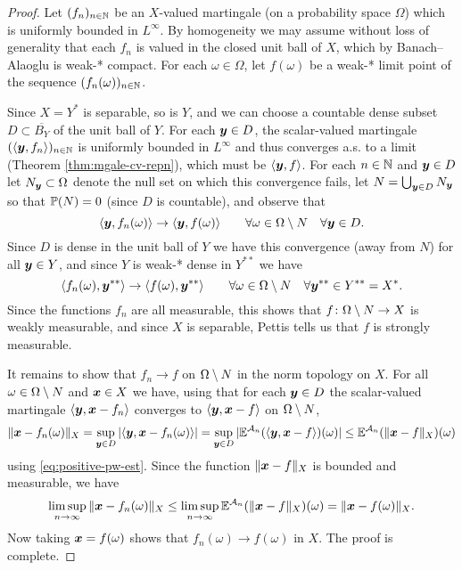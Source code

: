 \begin{proof}
  Let $(f_n)_{n \in \N}$ be an $X$-valued martingale (on a probability space $\Omega$) which is uniformly bounded in $L^\infty$.
  By homogeneity we may assume without loss of generality that each $f_n$ is valued in the closed unit ball of $X$, which by Banach--Alaoglu is weak-* compact.
  For each $\omega \in \Omega$, let $f(\omega)$ be a weak-* limit point of the sequence $(f_n(\omega))_{n \in \N}$.
  
  Since $X = Y^*$ is separable, so is $Y$, and we can choose a countable dense subset $D \subset \overline{B_{Y}}$ of the unit ball of $Y$.
  For each $\mb{y} \in D$, the scalar-valued martingale $(\langle \mb{y}, f_n \rangle)_{n \in \N}$ is uniformly bounded in $L^\infty$ and thus converges a.s. to a limit (Theorem \ref{thm:mgale-cv-repn}), which must be $\langle \mb{y}, f \rangle$.
  For each $n \in \N$ and $\mb{y} \in D$ let $N_{\mb{y}} \subset \Omega$ denote the null set on which this convergence fails, let $N = \bigcup_{\mb{y} \in D} N_{\mb{y}}$ so that $\P(N) = 0$ (since $D$ is countable), and observe that
  \begin{equation*}
    \langle \mb{y}, f_n(\omega) \rangle \to \langle \mb{y}, f(\omega) \rangle \qquad \forall \omega \in \Omega \sm N \quad \forall \mb{y} \in D.
  \end{equation*}
  Since $D$ is dense in the unit ball of $Y$ we have this convergence (away from $N$) for all $\mb{y} \in Y$, and since $Y$ is weak-* dense in $Y^{**}$ we have
    \begin{equation*}
      \langle f_n(\omega), \mb{y}^{**} \rangle \to \langle f(\omega), \mb{y}^{**} \rangle \qquad \forall \omega \in \Omega \sm N \quad \forall \mb{y}^{**} \in Y^{**} = X^{*}.
  \end{equation*}
  Since the functions $f_n$ are all measurable, this shows that $\map{f}{\Omega \sm N}{X}$ is weakly measurable, and since $X$ is separable, Pettis tells us that $f$ is strongly measurable.

  It remains to show that $f_n \to f$ on $\Omega \sm N$ in the norm topology on $X$.
  For all $\omega \in \Omega \sm N$ and $\mb{x} \in X$ we have, using that for each $\mb{y} \in D$ the scalar-valued martingale $\langle \mb{y}, \mb{x} - f_n \rangle$ converges to $\langle \mb{y}, \mb{x} - f \rangle$ on $\Omega \sm N$, 
  \begin{equation*}
    \|\mb{x} - f_n(\omega)\|_{X}
    = \sup_{\mb{y} \in D} |\langle \mb{y}, \mb{x} - f_n(\omega) \rangle| 
    = \sup_{\mb{y} \in D} |\E^{\mc{A}_n} (\langle \mb{y}, \mb{x} - f \rangle)(\omega) | 
    \leq \E^{\mc{A}_n}( \|\mb{x} - f\|_{X})(\omega)
  \end{equation*}
  using \eqref{eq:positive-pw-est}.
  Since the function $\|\mb{x} - f\|_{X}$ is bounded and measurable, we have
  \begin{equation*}
    \limsup_{n \to \infty} \|\mb{x} - f_n(\omega)\|_{X} \leq \limsup_{n \to \infty} \E^{\mc{A}_n}( \|\mb{x} - f\|_{X})(\omega) = \|\mb{x} - f(\omega)\|_{X}.
  \end{equation*}
  Now taking $\mb{x} = f(\omega)$ shows that $f_n(\omega) \to f(\omega)$ in $X$.
  The proof is complete.  
\end{proof}

